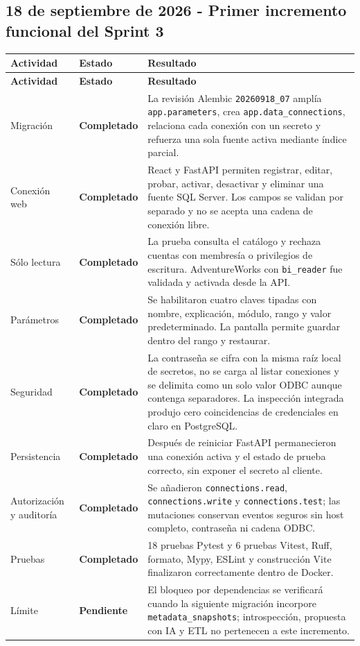 \documentclass[11pt,letterpaper]{article}
\newcommand{\statusok}{\textcolor{deepgreen}{\textbf{Completado}}}
\newcommand{\statuspending}{\textcolor{warning}{\textbf{Pendiente}}}
\newcommand{\file}[1]{\texttt{#1}}
\begin{document}
\subsection{18 de septiembre de 2026 - Primer incremento funcional del Sprint 3}

\begin{longtable}{@{}p{}p{}p{}@{}}
  \toprule
  \textbf{Actividad} & \textbf{Estado} & \textbf{Resultado} \\
  \midrule
  \endfirsthead
  \toprule
  \textbf{Actividad} & \textbf{Estado} & \textbf{Resultado} \\
  \midrule
  \endhead
  Migración & \statusok & La revisión Alembic \file{20260918\_07} amplía \file{app.parameters}, crea \file{app.data\_connections}, relaciona cada conexión con un secreto y refuerza una sola fuente activa mediante índice parcial. \\
  Conexión web & \statusok & React y FastAPI permiten registrar, editar, probar, activar, desactivar y eliminar una fuente SQL Server. Los campos se validan por separado y no se acepta una cadena de conexión libre. \\
  Sólo lectura & \statusok & La prueba consulta el catálogo y rechaza cuentas con membresía o privilegios de escritura. AdventureWorks con \file{bi\_reader} fue validada y activada desde la API. \\
  Parámetros & \statusok & Se habilitaron cuatro claves tipadas con nombre, explicación, módulo, rango y valor predeterminado. La pantalla permite guardar dentro del rango y restaurar. \\
  Seguridad & \statusok & La contraseña se cifra con la misma raíz local de secretos, no se carga al listar conexiones y se delimita como un solo valor ODBC aunque contenga separadores. La inspección integrada produjo cero coincidencias de credenciales en claro en PostgreSQL. \\
  Persistencia & \statusok & Después de reiniciar FastAPI permanecieron una conexión activa y el estado de prueba correcto, sin exponer el secreto al cliente. \\
  Autorización y auditoría & \statusok & Se añadieron \file{connections.read}, \file{connections.write} y \file{connections.test}; las mutaciones conservan eventos seguros sin host completo, contraseña ni cadena ODBC. \\
  Pruebas & \statusok & 18 pruebas Pytest y 6 pruebas Vitest, Ruff, formato, Mypy, ESLint y construcción Vite finalizaron correctamente dentro de Docker. \\
  Límite & \statuspending & El bloqueo por dependencias se verificará cuando la siguiente migración incorpore \file{metadata\_snapshots}; introspección, propuesta con IA y ETL no pertenecen a este incremento. \\
  \bottomrule
\end{longtable}
\end{document}
